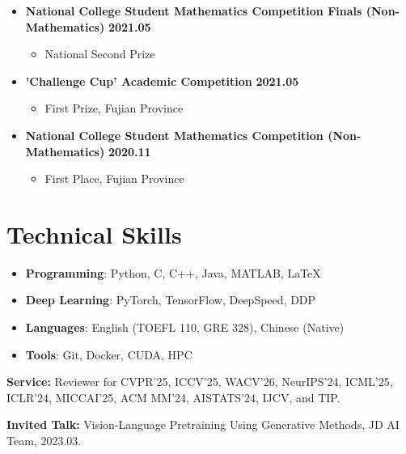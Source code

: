 \documentclass{resume}
\begin{document}
\begin{itemize}[leftmargin=0em, itemsep=3pt]
    \item \textbf{National College Student Mathematics Competition Finals (Non-Mathematics)} \hfill \textbf{2021.05}
    \begin{itemize}[leftmargin=1.5em]
        \item National Second Prize
    \end{itemize}

    \item \textbf{'Challenge Cup' Academic Competition} \hfill \textbf{2021.05}
    \begin{itemize}[leftmargin=1.5em]
        \item First Prize, Fujian Province
    \end{itemize}

    \item \textbf{National College Student Mathematics Competition (Non-Mathematics)} \hfill \textbf{2020.11}
    \begin{itemize}[leftmargin=1.5em]
        \item First Place, Fujian Province
    \end{itemize}
\end{itemize}
\section{\makebox[.75em][c]{\faCogs} \textbf{Technical Skills}}
\noindent
\begin{minipage}[t]{.5\textwidth}
    \begin{itemize}
    \item \textbf{Programming}: Python, C, C++, Java, MATLAB, \LaTeX
    \item \textbf{Deep Learning}: PyTorch, TensorFlow, DeepSpeed, DDP
    \end{itemize}
\end{minipage}
\begin{minipage}[t]{.5\textwidth}
    \begin{itemize}
    \item \textbf{Languages}: English (TOEFL 110, GRE 328), Chinese (Native)
    \item \textbf{Tools}: Git, Docker, CUDA, HPC
    \end{itemize}
\end{minipage}

{\footnotesize\noindent\textbf{Service:} Reviewer for CVPR'25, ICCV'25, WACV'26, NeurIPS'24, ICML'25, ICLR'24, MICCAI'25, ACM MM'24, AISTATS'24, IJCV, and TIP.\par
\noindent\textbf{Invited Talk:} Vision-Language Pretraining Using Generative Methods, JD AI Team, 2023.03.}

\end{document}
